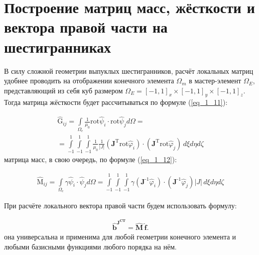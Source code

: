 \section{Построение матриц масс, жёсткости и вектора правой части на шестигранниках}

В силу сложной геометрии выпуклых шестигранников, расчёт локальных матриц удобнее проводить на отображении конечного элемента $\Omega_m$ в мастер-элемент $\Omega_E$, представляющий из себя куб размером $\Omega_E = [-1, 1]_x \times [-1, 1]_y \times [-1, 1]_z$. Тогда матрица жёсткости будет рассчитываться по формуле (\ref{eq_1_11}):

\begin{equation} \label{eq_1_11}
\begin{gathered}
	\hat{\text{G}}_{ij} = \int \limits_{\Omega_e} \frac{1}{\mu_0} \text{rot}  \hat{\text{$\psi$}}_i \cdot \text{rot} \hat{\text{$\psi$}}_j d \Omega = \\ = \int \limits_{-1}^1 \int \limits_{-1}^1 \int \limits_{-1}^1 \frac{1}{\mu_0} \frac{1}{|J|} \left( \textbf{J}^{\text{T}} \text{rot} \hat{\varphi}_i \right) \cdot \left( \textbf{J}^{\text{T}} \text{rot} \hat{\varphi}_j \right) \, d \xi d \eta d \zeta
\end{gathered}
\end{equation}
матрица масс, в свою очередь, по формуле (\ref{eq_1_12}):

\begin{equation} \label{eq_1_12}
	\begin{gathered}
		\hat{\text{M}}_{ij} = \int \limits_{\Omega_e} \gamma  \hat{\text{$\psi$}}_i \cdot \hat{\text{$\psi$}}_j d \Omega = \int \limits_{-1}^1 \int \limits_{-1}^1 \int \limits_{-1}^1 \gamma  \left( \textbf{J}^{\text{-1}} \hat{\varphi}_i \right) \cdot \left( \textbf{J}^{\text{-1}} \hat{\varphi}_j \right) |J| \, d \xi d \eta d \zeta
	\end{gathered}
\end{equation}

При расчёте локального вектора правой части будем использовать формулу:

\begin{equation} \label{eq_1_13}
	\begin{gathered}
		\hat{\textbf{b}}^{\textbf{J}^{\textbf{CT}}} = \hat{\textbf{M}} \, \hat{\textbf{f}}.
	\end{gathered}
\end{equation}
она универсальна и применима для любой геометрии конечного элемента и любыми базисными функциями любого порядка на нём.

